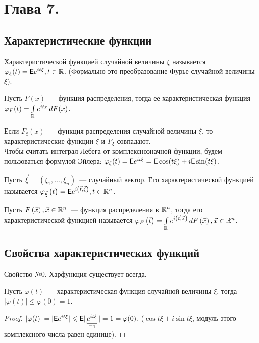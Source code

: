 \section{Глава 7.}

\subsection{Характеристические функции}
\begin{definition}
	Характеристической функцией случайной величины $\xi$ называется $\varphi_\xi(t) = \mathsf{E} e^{it\xi}, t \in \mathbb{R}$. (Формально это преобразование Фурье случайной величины $\xi$).
\end{definition}
\begin{definition}
	Пусть $F(x)$~--- функция распределения, тогда ее характеристическая функция $\varphi_F (t) = \int\limits_{\mathbb{R}} e^{i t x} \, d F(x)$.
\end{definition}
 Если $F_\xi(x)$~--- функция распределения случайной величины $\xi$, то характеристические функции $\xi$ и $F_\xi$ совпадают.\\
 
Чтобы считать интеграл Лебега от комплекснозначной функции, будем пользоваться формулой Эйлера: $\varphi_\xi(t) = \mathsf{E} e^{i t \xi} = \mathsf{E} \cos (t \xi) + i \mathsf{E} \sin(t \xi)$.
 
 \begin{definition}
 	Пусть $\vec \xi = ( \xi_1, \ldots, \xi_n)$~--- случайный вектор. Его характеристической функцией называется $\varphi_{\vec \xi} \left(\vec t \right) = \mathsf{E} e^{i \left( \vec t, \vec \xi \right)}, t \in \mathbb{R}^n$.
 \end{definition}
 \begin{definition}
 	Пусть $F \left( \vec x \right), \vec x \in \mathbb{R}^n$~--- функция распределения в $\mathbb{R}^n$, тогда его характеристической функцией называется $\varphi_F \left( \vec t \right) = \int\limits_{\mathbb{R}} e^{i \left( \vec t, \vec x \right)} \, d F \left( \vec x \right), \vec x \in \mathbb{R}^n$.
 \end{definition}
 \subsection{Свойства характеристических функций}
 Свойство №0. Харфункция существует всегда.
 \setcounter{property}{0}
 \begin{property}
 	Пусть $\varphi(t)$~--- характеристическая функция случайной величины $\xi$, тогда $| \varphi (t) | \leqslant \varphi(0) = 1$.
 	\begin{proof}
 		$| \varphi(t) | = | \E e^{i t \xi} | \leqslant \E | \underbracket[0.5pt]{e^{i t \xi}}_{\equiv 1} | = 1 = \varphi(0)$. ($\cos t\xi + i \sin t\xi$, модуль этого комплексного числа равен единице).
 	\end{proof}
 \end{property}
 
